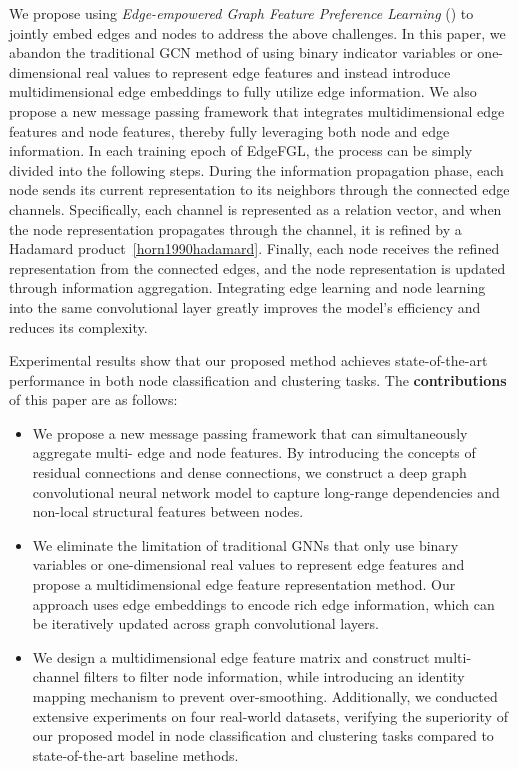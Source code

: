 We propose using \emph{Edge-empowered Graph Feature Preference Learning} (\alg) to jointly embed edges and nodes to address the above challenges. 
In this paper, we abandon the traditional GCN method of using binary indicator variables or one-dimensional real values to represent edge features and instead introduce multidimensional edge embeddings to fully utilize edge information. 
We also propose a new message passing framework that integrates multidimensional edge features and node features, thereby fully leveraging both node and edge information.
In each training epoch of EdgeFGL, the process can be simply divided into the following steps. During the information propagation phase, each node sends its current representation to its neighbors through the connected edge channels. 
Specifically, each channel is represented as a relation vector, and when the node representation propagates through the channel, it is refined by a Hadamard product~\ref{horn1990hadamard}. 
Finally, each node receives the refined representation from the connected edges, and the node representation is updated through information aggregation. 
Integrating edge learning and node learning into the same convolutional layer greatly improves the model’s efficiency and reduces its complexity.

Experimental results show that our proposed method achieves state-of-the-art performance in both node classification and clustering tasks. 
The \textbf{contributions} of this paper are as follows:
\begin{itemize}[leftmargin=*]
    \item We propose a new message passing framework that can simultaneously aggregate multi- edge and node features. By introducing the concepts of residual connections and dense connections, we construct a deep graph convolutional neural network model to capture long-range dependencies and non-local structural features between nodes.
    \item We eliminate the limitation of traditional GNNs that only use binary variables or one-dimensional real values to represent edge features and propose a multidimensional edge feature representation method. Our approach uses edge embeddings to encode rich edge information, which can be iteratively updated across graph convolutional layers.
	\item We design a multidimensional edge feature matrix and construct multi-channel filters to filter node information, while introducing an identity mapping mechanism to prevent over-smoothing. Additionally, we conducted extensive experiments on four real-world datasets, verifying the superiority of our proposed model in node classification and clustering tasks compared to state-of-the-art baseline methods.
\end{itemize}



